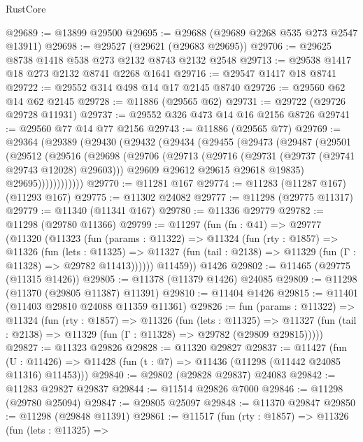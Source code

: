 \begin{lexlean}{RustCore}
\begin{coremodule}
@29689 := @13899 @29500
@29695 := @29688 (@29689 @2268 @535 @273 @2547 @13911)
@29698 := @29527 (@29621 (@29683 @29695))
@29706 := @29625 @8738 @1418 @538 @273 @2132 @8743 @2132 @2548
@29713 := @29538 @1417 @18 @273 @2132 @8741 @2268 @1641
@29716 := @29547 @1417 @18 @8741
@29722 := @29552 @314 @498 @14 @17 @2145 @8740
@29726 := @29560 @62 @14 @62 @2145
@29728 := @11886 (@29565 @62)
@29731 := @29722 (@29726 @29728 @11931)
@29737 := @29552 @326 @473 @14 @16 @2156 @8726
@29741 := @29560 @77 @14 @77 @2156
@29743 := @11886 (@29565 @77)
@29769 := @29364
    (@29389
      (@29430
        (@29432
          (@29434
            (@29455
              (@29473
                (@29487
                  (@29501
                    (@29512
                      (@29516
                        (@29698
                          (@29706
                            (@29713
                              (@29716 (@29731 (@29737 (@29741 @29743 @12028) @29603)))
                              @29609
                              @29612
                              @29615
                              @29618
                              @19835)
                            @29695))))))))))))
@29770 := @11281 @167
@29774 := @11283 (@11287 @167) (@11293 @167)
@29775 := @11302 @24082
@29777 := @11298 (@29775 @11317)
@29779 := @11340 (@11341 @167)
@29780 := @11336 @29779
@29782 := @11298 (@29780 @11366)
@29799 := @11297
    (fun (fn : @41) =>
    @29777
      (@11320
        (@11323
          (fun (params : @11322) =>
          @11324
            (fun (rty : @1857) =>
            @11326
              (fun (lets : @11325) =>
              @11327 (fun (tail : @2138) => @11329 (fun (Γ : @11328) => @29782 @11413))))))
        @11459))
    @1426
@29802 := @11465 (@29775 (@11315 @1426))
@29805 := @11378 (@11379 @1426) @24085
@29809 := @11298 (@11370 (@29805 @11387) @11391)
@29810 := @11404 @1426
@29815 := @11401 (@11403 @29810 @24088 @11359 @11361)
@29826 := fun (params : @11322) =>
  @11324
    (fun (rty : @1857) =>
    @11326
      (fun (lets : @11325) =>
      @11327 (fun (tail : @2138) => @11329 (fun (Γ : @11328) => @29782 (@29809 @29815)))))
@29827 := @11323 @29826
@29828 := @11320 @29827
@29837 := @11427
    (fun (U : @11426) => @11428 (fun (t : @7) => @11436 (@11298 (@11442 @24085 @11316) @11453)))
@29840 := @29802 (@29828 @29837) @24083
@29842 := @11283 @29827 @29837
@29844 := @11514 @29826 @7000
@29846 := @11298 (@29780 @25094)
@29847 := @29805 @25097
@29848 := @11370 @29847
@29850 := @11298 (@29848 @11391)
@29861 := @11517
    (fun (rty : @1857) =>
    @11326
      (fun (lets : @11325) =>

\end{coremodule}
\end{lexlean}
